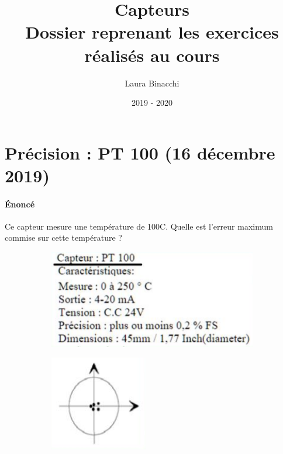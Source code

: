 \documentclass{article}
\title{Capteurs \\
    \large Dossier reprenant les exercices réalisés au cours}
\date{2019 - 2020}
\author{Laura Binacchi}
\begin{document}
\maketitle
\newpage
\tableofcontents
\newpage
{}
\pagestyle{fancy} 

\section{Précision : PT 100 (16 décembre 2019)}
\paragraph{Énoncé}
Ce capteur mesure une température de 100\degree C. Quelle est l'erreur maximum commise sur cette température ?

\begin{figure}[H]
    \centering
    \begin{subfigure}[b]{0.4\linewidth}
        \includegraphics[width=\linewidth]{./images/002-precision-pt-100.png}
    \end{subfigure}
    \begin{subfigure}[b]{0.2\linewidth}
        \includegraphics[width=\linewidth]{./images/003-precision-pt-100.png}
    \end{subfigure}
\end{figure}
\end{document}
